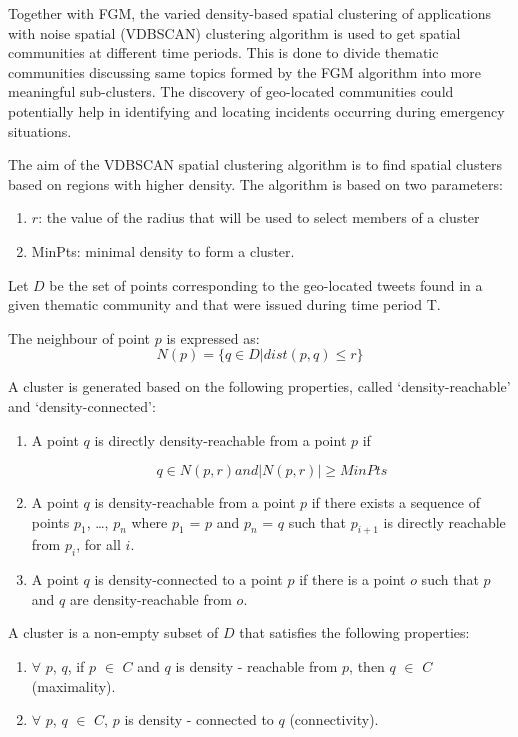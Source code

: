 Together with FGM, the varied density-based spatial clustering of applications with noise spatial (VDBSCAN) clustering algorithm is used to get spatial communities at different time periods. This is done to divide thematic communities discussing same topics formed by the FGM algorithm into more meaningful sub-clusters. The discovery of geo-located communities could potentially help in identifying and locating incidents occurring during emergency situations.

The aim of the VDBSCAN spatial clustering algorithm is to find spatial clusters based on regions with higher density. The algorithm is based on two parameters:
\begin{enumerate}
	\item $r$: the value of the radius that will be used to select members of a cluster
	\item MinPts: minimal density to form a cluster.
\end{enumerate}
Let $D$ be the set of points corresponding to the geo-located tweets found in a given thematic community and that were issued during time period T.

The neighbour of point $p$ is expressed as:
\begin{equation}
N(p) = \{ q \in D|dist(p,q) \le r \}
\end{equation}

A cluster is generated based on the following properties, called ‘density-reachable’ and ‘density-connected’:
\begin{enumerate}
	\item A point $q$ is directly density-reachable from a point $p$ if
	
	\begin{equation}
	q \in N(p,r) and |N(p,r)| \ge MinPts
	\end{equation}
	
	\item A point $q$ is density-reachable from a point $p$ if there exists a sequence of points $p_1$, …, $p_n$ where $p_1$ = $p$ and $p_n$ = $q$ such that $p_{i+1}$ is directly reachable from $p_i$, for all $i$.
	\item A point $q$ is density-connected to a point $p$ if there is a point $o$ such that $p$ and $q$ are density-reachable from $o$.
\end{enumerate}

A cluster is a non-empty subset of $D$ that satisfies the following properties:
\begin{enumerate}
	\item $\forall$ $p$, $q$, if $p$ $\in$ $C$ and $q$ is density - reachable from $p$, then $q$ $\in$ $C$ (maximality).
	\item $\forall$ $p$, $q$ $\in$ $C$, $p$ is density - connected to $q$ (connectivity).
\end{enumerate}

